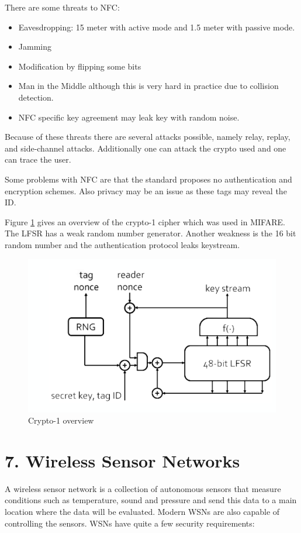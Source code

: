 \documentclass{article}
\begin{document}
\noindent There are some threats to NFC:

\begin{itemize}
\item Eavesdropping: 15 meter with active mode and 1.5 meter with passive mode.
\item Jamming
\item Modification by flipping some bits
\item Man in the Middle although this is very hard in practice due to collision detection.
\item NFC specific key agreement may leak key with random noise.
\end{itemize}

\noindent Because of these threats there are several attacks possible, namely relay, replay, and side-channel attacks. Additionally one can attack the crypto used and one can trace the user.

Some problems with NFC are that the standard proposes no authentication and encryption schemes. Also privacy may be an issue as these tags may reveal the ID.

Figure \ref{fig:crypto1overview} gives an overview of the crypto-1 cipher which was used in MIFARE. The LFSR has a weak random number generator. Another weakness is the 16 bit random number and the authentication protocol leaks keystream.

\begin{figure}[!h]
\centering
\includegraphics[width=\textwidth, height=\textheight, keepaspectratio]{images/crypto1overview.png}
\caption{Crypto-1 overview}
\label{fig:crypto1overview}
\end{figure}

\section*{7. Wireless Sensor Networks}
A wireless sensor network is a collection of autonomous sensors that measure conditions such as temperature, sound and pressure and send this data to a main location where the data will be evaluated. Modern WSNs are also capable of controlling the sensors. WSNs have quite a few security requirements:
\end{document}

